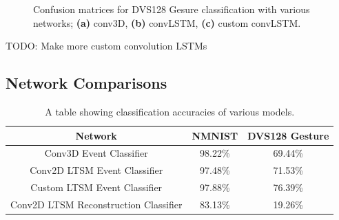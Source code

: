 \begin{figure}[htb]%
    \centering
    \qquad
    \qquad
    \caption{Confusion matrices for DVS128 Gesure classification with various networks; \textbf{(a)} conv3D, \textbf{(b)} convLSTM, \textbf{(c)} custom convLSTM.}%
    \label{fig:dvs128_c_matrices}%
\end{figure}

\color{red} TODO: Make more custom convolution LSTMs \color{black}

\subsection{Network Comparisons}

\begin{table}[htb]
    \centering
    \begin{tabular}{|| c | c | c ||}
        \hline
        Network     & NMNIST & DVS128 Gesture \\
        \hline \hline
        Conv3D Event Classifier          & 98.22\%   &   69.44\%    \\
        \hline
        Conv2D LTSM Event Classifier         & 97.48\%   &    71.53\%    \\
        \hline
        Custom LTSM Event Classifier         & 97.88\%  &   76.39\%     \\
        \hline
        Conv2D LTSM Reconstruction Classifier           & \color{red} 83.13\% \color{black}    &    \color{red} 19.26\% \color{black}   \\
        \hline
    \end{tabular}
    \caption{A table showing classification accuracies of various models.}
    \label{tab:network_performances}
\end{table}

